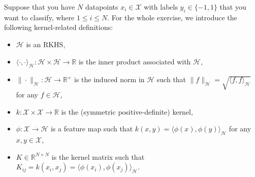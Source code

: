 
Suppose that you have $N$ datapoints $x_i \in \mathcal{X}$ with labels $y_i \in \{-1,1\}$ that you want to classify, where $1\leqslant i \leqslant N$. For the whole exercise, we introduce the following kernel-related definitions:
\begin{itemize}
    \item $\mathcal{H}$ is an RKHS,
    \item $\langle \cdot, \cdot \rangle_{\mathcal{H}} : \mathcal{H} \times \mathcal{H} \to \mathbb{R}$ is the inner product associated with $\mathcal{H}$,
    \item $\| \cdot \|_{\mathcal{H}} : \mathcal{H} \to \mathbb{R}^+$ is the induced norm in $\mathcal{H}$ such that $ \| f \|_{\mathcal{H}} = \sqrt{\langle f, f \rangle_{\mathcal{H}}}$ for any $f\in \mathcal{H}$,
    \item $k: \mathcal{X} \times \mathcal{X} \to \mathbb{R}$ is the (symmetric positive-definite) kernel,
    \item $\phi: \mathcal{X} \to \mathcal{H}$ is a feature map such that $k(x,y) = \langle \phi(x), \phi(y) \rangle_{\mathcal{H}}$ for any $x,y \in \mathcal{X}$,
    \item $K \in \mathbb{R}^{N \times N}$ is the kernel matrix such that $K_{ij} = k(x_i,x_j) = \langle \phi(x_i), \phi(x_j) \rangle_{\mathcal{H}}$.
\end{itemize}

